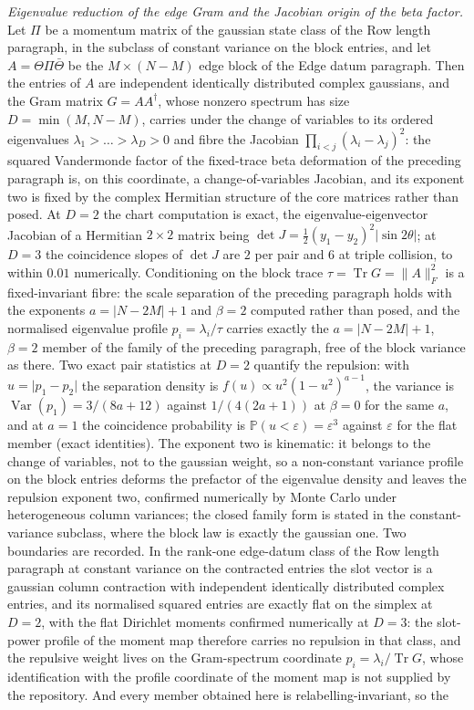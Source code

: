 \emph{Eigenvalue reduction of the edge Gram and the Jacobian origin of the beta factor.} Let \(\Pi\) be a momentum matrix of the gaussian state class of the Row length paragraph, in the subclass of constant variance on the block entries, and let \(A=\Theta\Pi\bar\Theta\) be the \(M\times(N-M)\) edge block of the Edge datum paragraph. Then the entries of \(A\) are independent identically distributed complex gaussians, and the Gram matrix \(G=AA^{\dagger}\), whose nonzero spectrum has size \(D=\min(M,N-M)\), carries under the change of variables to its ordered eigenvalues \(\lambda_{1}>\dots>\lambda_{D}>0\) and fibre the Jacobian \(\prod_{i<j}(\lambda_{i}-\lambda_{j})^{2}\): the squared Vandermonde factor of the fixed-trace beta deformation of the preceding paragraph is, on this coordinate, a change-of-variables Jacobian, and its exponent two is fixed by the complex Hermitian structure of the core matrices rather than posed. At \(D=2\) the chart computation is exact, the eigenvalue-eigenvector Jacobian of a Hermitian \(2\times2\) matrix being \(\det J=\tfrac{1}{2}(y_{1}-y_{2})^{2}\lvert\sin 2\theta\rvert\); at \(D=3\) the coincidence slopes of \(\det J\) are \(2\) per pair and \(6\) at triple collision, to within \(0.01\) numerically. Conditioning on the block trace \(\tau=\operatorname{Tr}G=\lVert A\rVert_{F}^{2}\) is a fixed-invariant fibre: the scale separation of the preceding paragraph holds with the exponents \(a=\lvert N-2M\rvert+1\) and \(\beta=2\) computed rather than posed, and the normalised eigenvalue profile \(p_{i}=\lambda_{i}/\tau\) carries exactly the \(a=\lvert N-2M\rvert+1\), \(\beta=2\) member of the family of the preceding paragraph, free of the block variance as there. Two exact pair statistics at \(D=2\) quantify the repulsion: with \(u=\lvert p_{1}-p_{2}\rvert\) the separation density is \(f(u)\propto u^{2}(1-u^{2})^{a-1}\), the variance is \(\operatorname{Var}(p_{1})=3/(8a+12)\) against \(1/(4(2a+1))\) at \(\beta=0\) for the same \(a\), and at \(a=1\) the coincidence probability is \(\mathbb{P}(u<\varepsilon)=\varepsilon^{3}\) against \(\varepsilon\) for the flat member (exact identities). The exponent two is kinematic: it belongs to the change of variables, not to the gaussian weight, so a non-constant variance profile on the block entries deforms the prefactor of the eigenvalue density and leaves the repulsion exponent two, confirmed numerically by Monte Carlo under heterogeneous column variances; the closed family form is stated in the constant-variance subclass, where the block law is exactly the gaussian one. Two boundaries are recorded. In the rank-one edge-datum class of the Row length paragraph at constant variance on the contracted entries the slot vector is a gaussian column contraction with independent identically distributed complex entries, and its normalised squared entries are exactly flat on the simplex at \(D=2\), with the flat Dirichlet moments confirmed numerically at \(D=3\): the slot-power profile of the moment map therefore carries no repulsion in that class, and the repulsive weight lives on the Gram-spectrum coordinate \(p_{i}=\lambda_{i}/\operatorname{Tr}G\), whose identification with the profile coordinate of the moment map is not supplied by the repository. And every member obtained here is relabelling-invariant, so the 